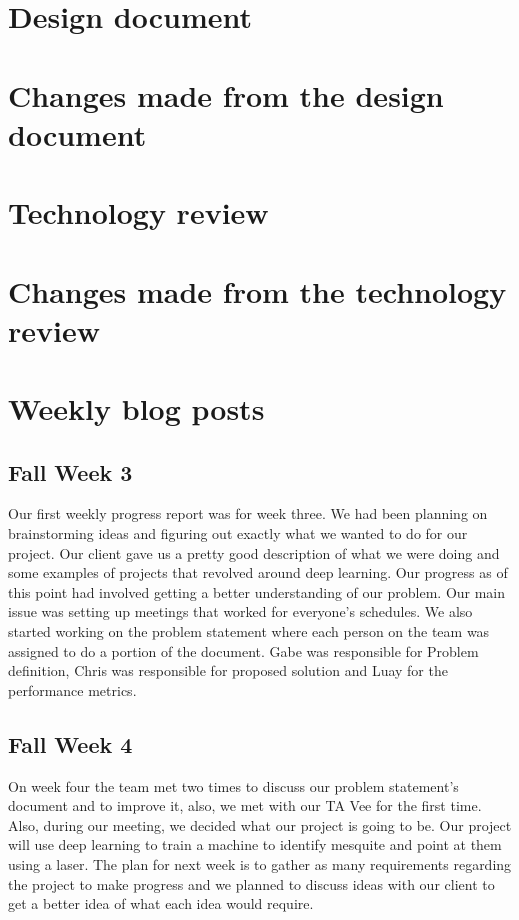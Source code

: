 \documentclass[onecolumn, draftclsnofoot,10pt, compsoc]{IEEEtran}
\begin{document}
\section{Design document}



\section{Changes made from the design document}

\section{Technology review}



\section{Changes made from the technology review}

\section{Weekly blog posts}

\subsection{Fall Week 3}
Our first weekly progress report was for week three.
We had been planning on brainstorming ideas and figuring out exactly what we wanted to do for our project.
Our client gave us a pretty good description of what we were doing and some examples of projects that revolved around deep learning.
Our progress as of this point had involved getting a better understanding of our problem.
Our main issue was setting up meetings that worked for everyone's schedules.
We also started working on the problem statement where each person on the team was assigned to do a portion of the document.
Gabe was responsible for Problem definition, Chris was responsible for proposed solution and Luay for the performance metrics.

\subsection{Fall Week 4}
On week four the team met two times to discuss our problem statement's document and to improve it, also, we met with our TA Vee for the first time.
Also, during our meeting, we decided what our project is going to be.
Our project will use deep learning to train a machine to identify mesquite and point at them using a laser.
The plan for next week is to gather as many requirements regarding the project to make progress and we planned to discuss ideas with our client to get a better idea of what each idea would require.
\end{document}
